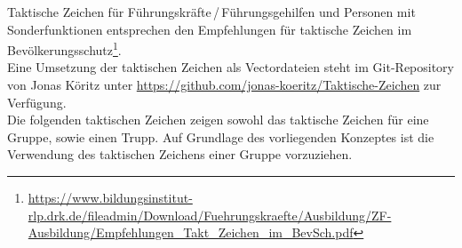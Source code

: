 \noindent Taktische Zeichen für Führungskräfte\,/\,Führungsgehilfen und Personen mit Sonderfunktionen entsprechen den \flq Empfehlungen für taktische Zeichen im Bevölkerungsschutz\frq{}\footnote{\url{https://www.bildungsinstitut-rlp.drk.de/fileadmin/Download/Fuehrungskraefte/Ausbildung/ZF-Ausbildung/Empfehlungen_Takt_Zeichen_im_BevSch.pdf}}.\\

\noindent Eine Umsetzung der taktischen Zeichen als Vectordateien steht im Git-Repository von Jonas Köritz  unter \href{https://github.com/jonas-koeritz/Taktische-Zeichen}{https://github.com/jonas-koeritz/Taktische-Zeichen} zur Verfügung.\\

\noindent Die folgenden taktischen Zeichen zeigen sowohl das taktische Zeichen für eine Gruppe, sowie einen Trupp. Auf Grundlage des vorliegenden Konzeptes ist die Verwendung des taktischen Zeichens einer Gruppe vorzuziehen.

\begin{figure}[h!]
  \centering
  \qquad
\end{figure}
